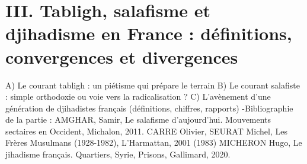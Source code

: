 
\chapter{III. Tabligh, salafisme et djihadisme en France : définitions, convergences et
divergences}

A) Le courant tabligh : un piétisme qui prépare le terrain
B) Le courant salafiste : simple orthodoxie ou voie vers la radicalisation ?
C) L’avènement d’une génération de djihadistes français (définitions, chiffres,
rapports)
-Bibliographie de la partie :
AMGHAR, Samir, Le salafisme d’aujourd’hui. Mouvements sectaires en Occident,
Michalon, 2011.
CARRE Olivier, SEURAT Michel, Les Frères Musulmans (1928-1982), L'Harmattan,
2001 (1983)
MICHERON Hugo, Le jihadisme français. Quartiers, Syrie, Prisons, Gallimard, 2020.